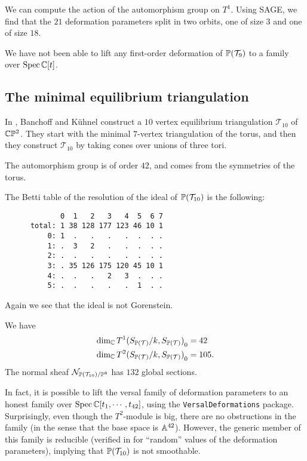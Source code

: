 We can compute the action of the automorphism group on $T^1$. Using SAGE, we find that the $21$ deformation parameters split in two orbits, one of size $3$ and one of size $18$.

We have not been able to lift any first-order deformation of $\P(\mathcal T_9)$ to a family over $\Spec \C[t]$. 

\subsection{The minimal equilibrium triangulation}

In \cite{banchoff_equilibrium}, Banchoff and Kühnel construct a $10$ vertex equilibrium triangulation $\mathcal T_{10}$  of $\C \P^2$. They start with the minimal $7$-vertex triangulation of the torus, and then they construct $\mathcal T_{10}$ by taking cones over unions of three tori.

The automorphism group is of order $42$, and comes from the symmetries of the torus. 

The Betti table of the resolution of the ideal of $\P(\mathcal T_{10})$ is the following:
\begin{verbatim}
             0  1   2   3   4  5  6 7
      total: 1 38 128 177 123 46 10 1
          0: 1  .   .   .   .  .  . .
          1: .  3   2   .   .  .  . .
          2: .  .   .   .   .  .  . .
          3: . 35 126 175 120 45 10 1
          4: .  .   .   2   3  .  . .
          5: .  .   .   .   .  1  . .
\end{verbatim}

Again we see that the ideal is not Gorenstein.

\begin{proposition}
We have 
\begin{eqnarray*}
\dim_\C  {T^1(S_{\P(\mathcal T)}/k, S_{\P(\mathcal T)})}_0 &= 42 \\
\dim_\C {T^2(S_{\P(\mathcal T)}/k, S_{\P(\mathcal T)})}_0  &= 105.
\end{eqnarray*}
The normal sheaf $\mathcal N_{\P(\mathcal T_{10})/\P^{8}}$ has $132$ global sections.
\end{proposition}

In fact, it is possible to lift the versal family of deformation parameters to an honest family over $\Spec \C[t_1,\cdots,t_{42}]$, using the \texttt{VersalDeformations} package. Surprisingly, even though the $T^2$-module is big, there are no obstructions in the family (in the sense that the base space is $\A^{42}$). However, the generic member of this family is reducible (verified in \MM for ``random'' values of the deformation parameters), implying that $\P(\mathcal T_{10})$ is not smoothable.

